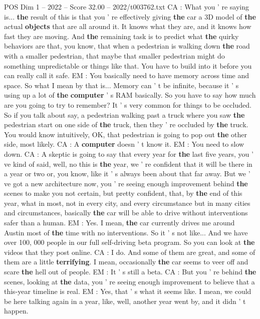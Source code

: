 \begin{textsample}{POS Dim 1 – 2022 – Score 32.00 – 2022/t003762.txt}
CA : What you ' re saying is... \textbf{the} result of this is that you ' re effectively giving \textbf{the} car a 3D model of \textbf{the} actual \textbf{objects} that are all around it.
It knows what they are, and it knows how fast they are moving.
And \textbf{the} remaining task is to predict what \textbf{the} quirky behaviors are that, you know, that when a pedestrian is walking down \textbf{the} road with a smaller pedestrian, that maybe that smaller pedestrian might do something unpredictable or things like that.
You have to build into it before you can really call it safe.
EM : You basically need to have memory across time and space.
So what I mean by that is...
Memory can ' t be infinite, because it ' s using up a lot of \textbf{the} \textbf{computer} ' s RAM basically.
So you have to say how much are you going to try to remember?
It ' s very common for things to be occluded.
So if you talk about say, a pedestrian walking past a truck where you saw \textbf{the} pedestrian start on one side of \textbf{the} truck, then they ' re occluded by \textbf{the} truck.
You would know intuitively, OK, that pedestrian is going to pop out \textbf{the} other side, most likely.
CA : A \textbf{computer} doesn ' t know it.
EM : You need to slow down.
CA : A skeptic is going to say that every year for \textbf{the} last five years, you ' ve kind of said, well, no this is \textbf{the} year, we ' re confident that it will be there in a year or two or, you know, like it ' s always been about that far away.
But we ' ve got a new architecture now, you ' re seeing enough improvement behind \textbf{the} scenes to make you not certain, but pretty confident, that, by \textbf{the} end of this year, what in most, not in every city, and every circumstance but in many cities and circumstances, basically \textbf{the} car will be able to drive without interventions safer than a human.
EM : Yes.
I mean, \textbf{the} car currently drives me around Austin most of \textbf{the} time with no interventions.
So it ' s not like...
And we have over 100, 000 people in our full self-driving beta program.
So you can look at \textbf{the} videos that they post online.
CA : I do.
And some of them are great, and some of them are a little \textbf{terrifying}.
I mean, occasionally \textbf{the} car seems to veer off and scare \textbf{the} hell out of people.
EM : It ' s still a beta.
CA : But you ' re behind \textbf{the} scenes, looking at \textbf{the} data, you ' re seeing enough improvement to believe that a this-year timeline is real.
EM : Yes, that ' s what it seems like.
I mean, we could be here talking again in a year, like, well, another year went by, and it didn ' t happen.

\end{textsample}
